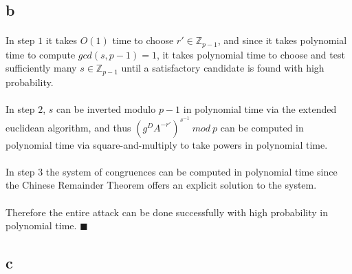 \documentclass[letterpaper,12pt,oneside,onecolumn]{report}
\begin{document}
\subsection*{b}
\paragraph{}
In step $1$ it takes $O(1)$ time to choose $r' \in \mathbb{Z}_{p-1}$, and since it takes polynomial time to compute $gcd(s,p-1) = 1$, it takes polynomial time to choose and test sufficiently many $s \in \mathbb{Z}_{p-1}$ until a satisfactory candidate is found with high probability.
\paragraph{}
In step $2$, $s$ can be inverted modulo $p-1$ in polynomial time via the extended euclidean algorithm, and thus $(g^DA^{-r'})^{s^{-1}}\ mod\ p$ can be computed in polynomial time via square-and-multiply to take powers in polynomial time.
\paragraph{}
In step $3$ the system of congruences can be computed in polynomial time since the Chinese Remainder Theorem offers an explicit solution to the system.
\paragraph{}
Therefore the entire attack can be done successfully with high probability in polynomial time. $\blacksquare$
\subsection*{c}
\end{document}
